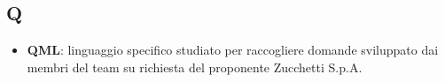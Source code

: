 \subsection{Q}
\begin{itemize}
	\item
	\textbf{QML}: linguaggio specifico studiato per raccogliere domande sviluppato dai membri del team \gruppo \hspace{1mm} su richiesta del proponente Zucchetti S.p.A.	
\end{itemize}